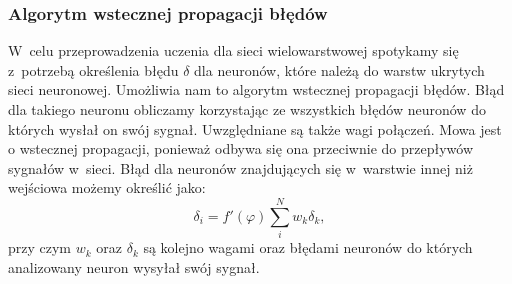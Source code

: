 \subsubsection{Algorytm wstecznej propagacji błędów}
W~celu przeprowadzenia uczenia dla sieci wielowarstwowej spotykamy się z~potrzebą określenia błędu $\delta$ dla neuronów, które należą do warstw ukrytych sieci neuronowej. Umożliwia nam to algorytm wstecznej propagacji błędów. Błąd dla takiego neuronu obliczamy korzystając ze wszystkich błędów neuronów do których wysłał on swój sygnał. Uwzględniane są także wagi połączeń. Mowa jest o wstecznej propagacji, ponieważ odbywa się ona przeciwnie do przepływów sygnałów w~sieci. Błąd dla neuronów znajdujących się w~warstwie innej niż wejściowa możemy określić jako:
\begin{equation}
\delta_i = f'(\varphi) \sum_{i}^{N}w_k \delta _k,
\end{equation}
przy czym $w_k$ oraz $\delta _k$ są kolejno wagami oraz błędami neuronów do których analizowany neuron wysyłał swój sygnał.
